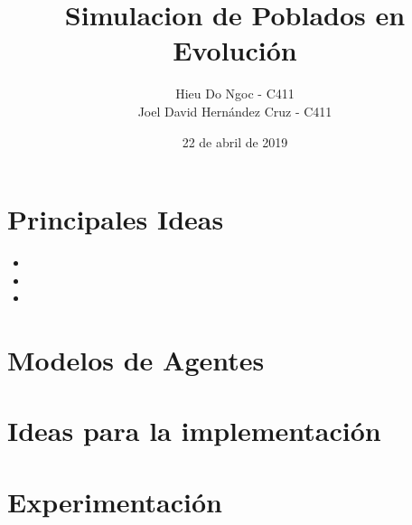 \documentclass[12pt]{article}
\title{Simulacion de Poblados en Evoluci\'on}
\author{Hieu Do Ngoc - C411 \\ Joel David Hern\'andez Cruz - C411}
\date{22 de abril de 2019}
\begin{document}
\maketitle
\newpage

\section{Principales Ideas} 
\begin{itemize}
	\item
	\item
	\item
\end{itemize}

\section{Modelos de Agentes}

\section{Ideas para la implementaci\'on}


\section{Experimentaci\'on}
\end{document}
